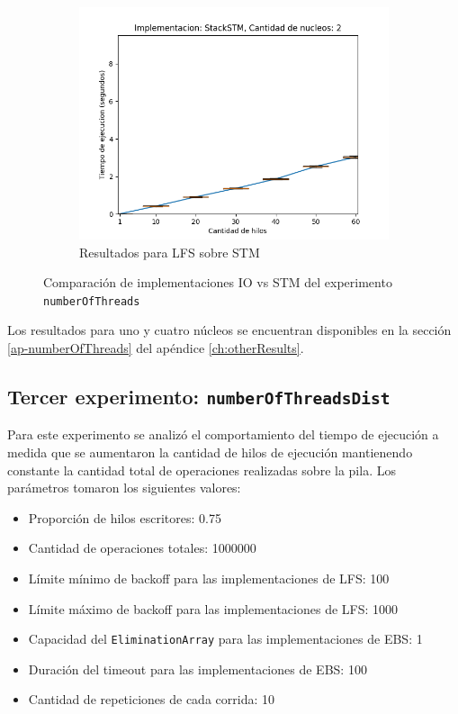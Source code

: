 \begin{figure}[t]
\begin{subfigure}[b]{0.49\textwidth}
        \includegraphics[width=\textwidth]{images/numberOfThreads/plots/expStackSTM-2}
        \caption{Resultados para LFS sobre STM}
        \label{subfig:numberOfThreads-stackstm-2}
    \end{subfigure}
    \caption{Comparación de implementaciones IO vs STM del experimento \texttt{numberOfThreads}}
    \label{fig:numberOfThreads-boxplots}
\end{figure}

Los resultados para uno y cuatro núcleos se encuentran disponibles en la sección \ref{ap-numberOfThreads} del apéndice \ref{ch:otherResults}.


\subsection{Tercer experimento: \texttt{numberOfThreadsDist}}
Para este experimento se analizó el comportamiento del tiempo de ejecución a medida que se aumentaron la cantidad de hilos de ejecución mantienendo constante la cantidad total de operaciones realizadas sobre la pila.
Los parámetros tomaron los siguientes valores:

\begin{itemize}
    \item Proporción de hilos escritores: 0.75
    \item Cantidad de operaciones totales: 1000000
    \item Límite mínimo de backoff para las implementaciones de LFS: 100
    \item Límite máximo de backoff para las implementaciones de LFS: 1000
    \item Capacidad del \texttt{EliminationArray} para las implementaciones de EBS: 1
    \item Duración del timeout para las implementaciones de EBS: 100
    \item Cantidad de repeticiones de cada corrida: 10
\end{itemize}

